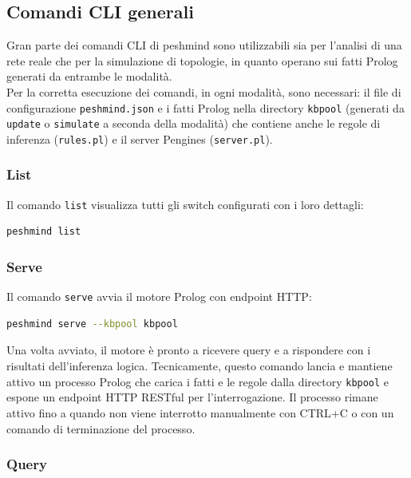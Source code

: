 \documentclass[12pt,a4paper]{article}
\begin{document}
\subsection{Comandi CLI generali}

Gran parte dei comandi CLI di peshmind sono utilizzabili sia per l'analisi di una rete reale che per la 
simulazione di topologie, in quanto operano sui fatti Prolog generati da entrambe le modalità. \\
Per la corretta esecuzione dei comandi, in ogni modalità, sono necessari: il file di configurazione \texttt{peshmind.json} 
e i fatti Prolog nella directory \texttt{kbpool} (generati da \texttt{update} o \texttt{simulate} a seconda della modalità)
che contiene anche le regole di inferenza (\texttt{rules.pl}) e il server Pengines (\texttt{server.pl}).

\subsubsection{List}

Il comando \texttt{list} visualizza tutti gli switch configurati con i loro dettagli:

\begin{lstlisting}[language=bash]
peshmind list
\end{lstlisting}

\subsubsection{Serve}

Il comando \texttt{serve} avvia il motore Prolog con endpoint HTTP:

\begin{lstlisting}[language=bash]
peshmind serve --kbpool kbpool
\end{lstlisting}

Una volta avviato, il motore è pronto a ricevere query e a rispondere con i risultati dell'inferenza logica.
Tecnicamente, questo comando lancia e mantiene attivo un processo Prolog che carica i fatti e le regole dalla directory
\texttt{kbpool} e espone un endpoint HTTP RESTful per l'interrogazione. Il processo rimane attivo fino a quando non viene
interrotto manualmente con CTRL+C o con un comando di terminazione del processo.

\subsubsection{Query}
\end{document}
